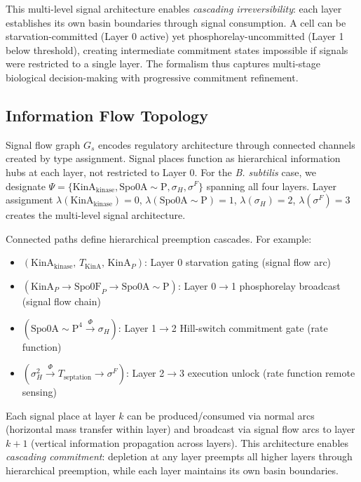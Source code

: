 \documentclass[10pt,letterpaper]{article}
\begin{document}
\vspace{3pt}
\noindent This multi-level signal architecture enables \textit{cascading irreversibility}: each layer establishes its own basin boundaries through signal consumption. A cell can be starvation-committed (Layer 0 active) yet phosphorelay-uncommitted (Layer 1 below threshold), creating intermediate commitment states impossible if signals were restricted to a single layer. The formalism thus captures multi-stage biological decision-making with progressive commitment refinement.

\subsection{Information Flow Topology}

Signal flow graph $G_s$ encodes regulatory architecture through connected channels created by type assignment. Signal places function as hierarchical information hubs at each layer, not restricted to Layer 0. For the \textit{B. subtilis} case, we designate $\Psi = \{\text{KinA}_{\text{kinase}}, \text{Spo0A}{\sim}\text{P}, \sigma_H, \sigma^F\}$ spanning all four layers. Layer assignment $\lambda(\text{KinA}_{\text{kinase}}) = 0$, $\lambda(\text{Spo0A}{\sim}\text{P}) = 1$, $\lambda(\sigma_H) = 2$, $\lambda(\sigma^F) = 3$ creates the multi-level signal architecture.

\vspace{3pt}
\noindent Connected paths define hierarchical preemption cascades. For example:
\begin{itemize}
\item $(\text{KinA}_{\text{kinase}},\, T_{\text{KinA}},\, \text{KinA}_P)$: Layer 0 starvation gating (signal flow arc)
\item $(\text{KinA}_P \to \text{Spo0F}_P \to \text{Spo0A}{\sim}\text{P})$: Layer 0$\rightarrow$1 phosphorelay broadcast (signal flow chain)
\item $(\text{Spo0A}{\sim}\text{P}^4 \xrightarrow{\Phi} \sigma_H)$: Layer 1$\rightarrow$2 Hill-switch commitment gate (rate function)
\item $(\sigma_H^2 \xrightarrow{\Phi} T_{\text{septation}} \to \sigma^F)$: Layer 2$\rightarrow$3 execution unlock (rate function remote sensing)
\end{itemize}
Each signal place at layer $k$ can be produced/consumed via normal arcs (horizontal mass transfer within layer) and broadcast via signal flow arcs to layer $k+1$ (vertical information propagation across layers). This architecture enables \textit{cascading commitment}: depletion at any layer preempts all higher layers through hierarchical preemption, while each layer maintains its own basin boundaries.
\end{document}
